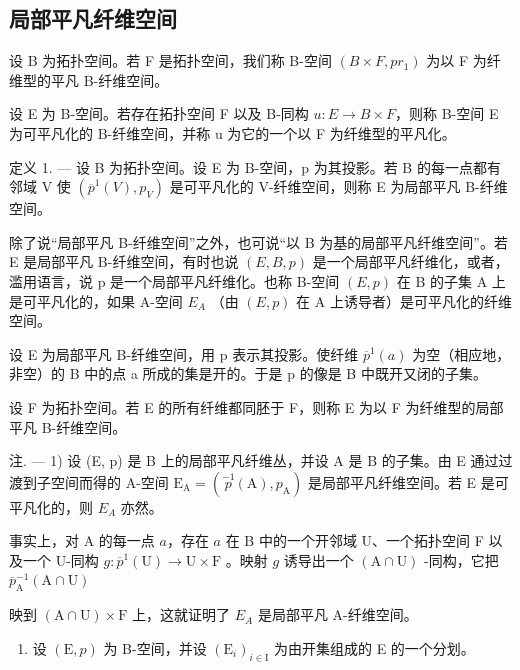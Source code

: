 \subsection{局部平凡纤维空间}

设 B 为拓扑空间。若 F 是拓扑空间，我们称 B-空间 \((B \times F, pr_{1})\) 为以 F 为纤维型的平凡 B-纤维空间。

设 E 为 B-空间。若存在拓扑空间 F 以及 B-同构 \(u: E \rightarrow B \times F\)，则称 B-空间 E 为可平凡化的 B-纤维空间，并称 u 为它的一个以 F 为纤维型的平凡化。

定义 1. --- 设 B 为拓扑空间。设 E 为 B-空间，p 为其投影。若 B 的每一点都有邻域 V 使 \((\overline{p}^{1}(V), p_{V})\) 是可平凡化的 V-纤维空间，则称 E 为局部平凡 B-纤维空间。

除了说“局部平凡 B-纤维空间”之外，也可说“以 B 为基的局部平凡纤维空间”。若 E 是局部平凡 B-纤维空间，有时也说 \((E,B,p)\) 是一个局部平凡纤维化，或者，滥用语言，说 p 是一个局部平凡纤维化。也称 B-空间 \((E,p)\) 在 B 的子集 A 上是可平凡化的，如果 A-空间 \(E_{A}\) （由 \((E,p)\) 在 A 上诱导者）是可平凡化的纤维空间。

设 E 为局部平凡 B-纤维空间，用 p 表示其投影。使纤维 \(\overline{p}^{1}(a)\) 为空（相应地，非空）的 B 中的点 a 所成的集是开的。于是 p 的像是 B 中既开又闭的子集。

设 F 为拓扑空间。若 E 的所有纤维都同胚于 F，则称 E 为以 F 为纤维型的局部平凡 B-纤维空间。

注. --- 1) 设 (E, p) 是 B 上的局部平凡纤维丛，并设 A 是 B 的子集。由 E 通过过渡到子空间而得的 A-空间 \(\mathrm{E}_{\mathrm{A}} = (\stackrel{-1}{p}(\mathrm{A}), p_{\mathrm{A}})\) 是局部平凡纤维空间。若 E 是可平凡化的，则 \(E_{A}\) 亦然。

事实上，对 A 的每一点 \(a\)，存在 \(a\) 在 B 中的一个开邻域 U、一个拓扑空间 F 以及一个 U-同构 \(g\colon \overline{p}^{1}(\mathrm{U})\to \mathrm{U}\times \mathrm{F}\) 。映射 \(g\) 诱导出一个 \((\mathrm{A}\cap \mathrm{U})\) -同构，它把 \(\overline{p}_{\mathrm{A}}^{-1}(\mathrm{A}\cap \mathrm{U})\)

映到 \((\mathrm{A}\cap\mathrm{U})\times\mathrm{F}\) 上，这就证明了 \(E_{A}\) 是局部平凡 A-纤维空间。

\begin{enumerate}
\def\labelenumi{\arabic{enumi})}
\setcounter{enumi}{1}
\tightlist
\item
  设 \((\mathrm{E}, p)\) 为 B-空间，并设 \((\mathrm{E}_{i})_{i \in \mathrm{I}}\) 为由开集组成的 E 的一个分划。
\end{enumerate}

